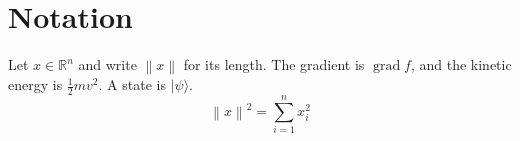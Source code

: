 \documentclass{article}
\newcommand{\R}{\mathbb{R}}
\newcommand{\norm}[1]{\left\lVert #1 \right\rVert}
\DeclareMathOperator{\grad}{grad}
\def\half{\tfrac{1}{2}}
\newcommand{\ket}[1]{|#1\rangle}
\begin{document}
\section{Notation}
Let $x \in \R^n$ and write $\norm{x}$ for its length. The gradient is $\grad f$, and
the kinetic energy is $\half m v^2$. A state is $\ket{\psi}$.
\begin{equation}
  \norm{x}^2 = \sum_{i=1}^n x_i^2
\end{equation}
\end{document}
